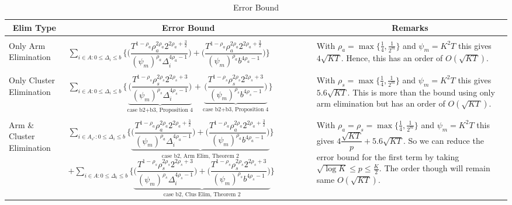 \begin{remark}
\begin{table}
\caption{Error Bound}
\label{App:E:table:3}
\begin{center}
\begin{tabular}{p{1.4cm}p{10.2cm}p{3.5cm}}
\multicolumn{1}{c}{\bf Elim Type} &\multicolumn{1}{c}{\bf Error Bound} &\multicolumn{1}{c}{\bf Remarks} \\
\hline \\
Only Arm Elimination	&$\sum_{i\in A:0\leq\Delta_{i}\leq b}\bigg\lbrace\bigg(\dfrac{T^{1-\rho_{a}}\rho_{a}^{2\rho_{a}}2^{2\rho_{a}+\frac{3}{2}}}{(\psi_{m})^{\rho_{a}}\Delta_{i}^{4\rho_{a} -1}} \bigg) + \bigg( \dfrac{T^{1-\rho_{a}}\rho_{a}^{2\rho_{a}}2^{2\rho_{a}+\frac{3}{2}}}{(\psi_{m})^{\rho_{a}}b^{4\rho_{a} -1}} \bigg)\bigg\rbrace$ & With $\rho_{a}=\max\lbrace\frac{1}{4},\frac{1}{2^{m}}\rbrace$ and $\psi_{m}=K^{2}T$ this gives $4\sqrt{KT}$. Hence, this has an order of $O(\sqrt{KT})$.\\
\hline\\
Only Cluster Elimination	&$\sum_{i\in A:0\leq\Delta_{i}\leq b}\bigg\lbrace\underbrace{\bigg(\dfrac{T^{1-\rho_{s}}\rho_{s}^{2\rho_{s}}2^{2\rho_{s}+3}}{(\psi_{m})^{\rho_{s}}\Delta_{i}^{4\rho_{s} -1}} \bigg)}_{\text{case b2+b3, Proposition 4}} +\underbrace{\bigg(\dfrac{T^{1-\rho_{s}}\rho_{s}^{2\rho_{s}}2^{2\rho_{s}+3}}{(\psi_{m})^{\rho_{s}}b^{4\rho_{s} -1}} \bigg)}_{\text{case b2+b3, Proposition 4}}\bigg\rbrace$ & With $\rho_{s}=\max\lbrace\frac{1}{4},\frac{1}{2^{m}}\rbrace$ and $\psi_{m}=K^{2}T$ this gives $5.6\sqrt{KT}$. This is more than the bound using only arm elimination but has an order of $O(\sqrt{KT})$.\\
\hline\\
Arm \& Cluster Elimination 	&$\sum_{i\in A_{s^{*}}:0\leq\Delta_{i}\leq b}\bigg\lbrace \underbrace{\bigg(\dfrac{T^{1-\rho_{a}}\rho_{a}^{2\rho_{a}}2^{2\rho_{a}+\frac{3}{2}}}{(\psi_{m})^{\rho_{a}}\Delta_{i}^{4\rho_{a}-1}} \bigg)+\bigg(\dfrac{T^{1-\rho_{a}}\rho_{a}^{2\rho_{a}}2^{2\rho_{a}+\frac{3}{2}}}{(\psi_{m})^{\rho_{a}}b^{4\rho_{a} -1}} \bigg)}_{\text{case b2, Arm Elim, Theorem 2}}\bigg\rbrace $ $+ \sum_{i\in A:0\leq\Delta_{i}\leq b}\bigg\lbrace\underbrace{\bigg(\dfrac{T^{1-\rho_{s}}\rho_{s}^{2\rho_{s}}2^{2\rho_{s}+3}}{(\psi_{m})^{\rho_{s}}\Delta_{i}^{4\rho_{s}-1}} \bigg)+\bigg(\dfrac{T^{1-\rho_{s}}\rho_{s}^{2\rho_{s}}2^{2\rho_{s}+3}}{(\psi_{m})^{\rho_{s}}b^{4\rho_{s} -1}} \bigg)}_{\text{case b2, Clus Elim, Theorem 2}} \bigg\rbrace$ & With $\rho_{a}=\rho_{s}=\max\lbrace\frac{1}{4},\frac{1}{2^{m}}\rbrace$ and $\psi_{m}=K^{2}T$ this gives $4\dfrac{\sqrt{KT}}{p} + 5.6\sqrt{KT}$. So we can reduce the error bound for the first term by taking $\sqrt{\log K}\leq p\leq \frac{K}{2}$. The order though will remain same $O(\sqrt{KT})$.

\end{tabular}
\end{center}
\end{table}
\end{remark}
